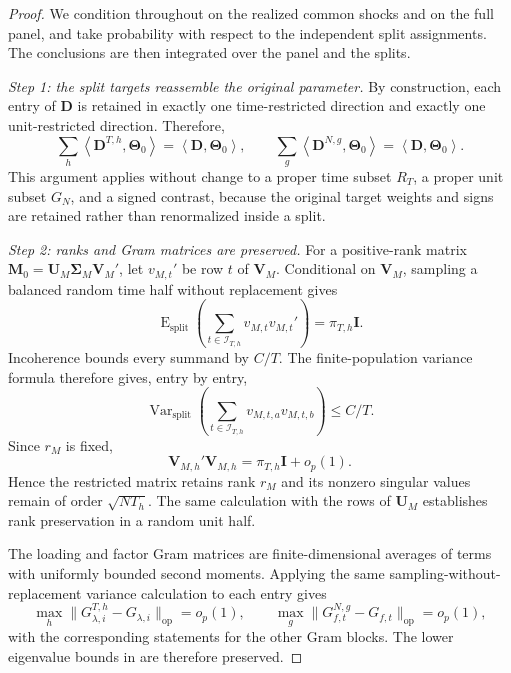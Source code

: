 \documentclass[11pt]{article}
\numberwithin{equation}{section}
\theoremstyle{remark}
\newcommand{\op}{\operatorname{op}}
\newcommand{\ip}[2]{\left\langle #1,#2\right\rangle}
\newcommand{\bD}{\bm D}
\newcommand{\bM}{\bm M}
\newcommand{\bU}{\bm U}
\newcommand{\bV}{\bm V}
\newcommand{\bTheta}{\bm\Theta}
\newcommand{\bSigma}{\bm\Sigma}
\begin{document}
\begin{proof}
We condition throughout on the realized common shocks and on the full panel, and take probability with respect to the independent split assignments. The conclusions are then integrated over the panel and the splits.

\emph{Step 1: the split targets reassemble the original parameter.}
By construction, each entry of $\bD$ is retained in exactly one time-restricted direction and exactly one unit-restricted direction. Therefore,
$$
\sum_h\ip{\bD^{T,h}}{\bTheta_0}
=
\ip{\bD}{\bTheta_0},
\qquad
\sum_g\ip{\bD^{N,g}}{\bTheta_0}
=
\ip{\bD}{\bTheta_0}.
$$
This argument applies without change to a proper time subset $R_T$, a proper unit subset $G_N$, and a signed contrast, because the original target weights and signs are retained rather than renormalized inside a split.

\emph{Step 2: ranks and Gram matrices are preserved.}
For a positive-rank matrix $\bM_0=\bU_M\bSigma_M\bV_M'$, let $v_{M,t}'$ be row $t$ of $\bV_M$. Conditional on $\bV_M$, sampling a balanced random time half without replacement gives
$$
\operatorname E_{\mathrm{split}}
\left(
\sum_{t\in\mathcal I_{T,h}}v_{M,t}v_{M,t}'
\right)
=
\pi_{T,h}\bm I.
$$
Incoherence bounds every summand by $C/T$. The finite-population variance formula therefore gives, entry by entry,
$$
\operatorname{Var}_{\mathrm{split}}
\left(
\sum_{t\in\mathcal I_{T,h}}v_{M,t,a}v_{M,t,b}
\right)
\le C/T.
$$
Since $r_M$ is fixed,
$$
\bV_{M,h}'\bV_{M,h}
=
\pi_{T,h}\bm I+o_p(1).
$$
Hence the restricted matrix retains rank $r_M$ and its nonzero singular values remain of order $\sqrt{NT_h}$. The same calculation with the rows of $\bU_M$ establishes rank preservation in a random unit half.

The loading and factor Gram matrices are finite-dimensional averages of terms with uniformly bounded second moments. Applying the same sampling-without-replacement variance calculation to each entry gives
$$
\max_h\|G_{\lambda,i}^{T,h}-G_{\lambda,i}\|_{\op}=o_p(1),
\qquad
\max_g\|G_{f,t}^{N,g}-G_{f,t}\|_{\op}=o_p(1),
$$
with the corresponding statements for the other Gram blocks. The lower eigenvalue bounds in  are therefore preserved.


\end{proof}
\end{document}
